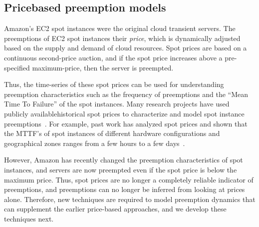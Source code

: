 \subsection{Price\vj{-}based preemption models}

Amazon's EC2 spot instances were the original cloud transient servers.
The preemptions of EC2 spot instances   their \emph{price}, which is dynamically adjusted based on the supply and demand of cloud resources.
Spot prices are  based on a continuous second-price auction, and if the spot price increases above a pre-specified maximum-price, then the server is preempted.

Thus, the time-series of these spot prices can be used for understanding preemption characteristics such as the frequency of preemptions and the ``Mean Time To Failure'' of the spot instances.
Many research projects have used publicly available\footnotemark historical spot prices to characterize and model spot instance preemptions~\cite{spotcheck,how-to-bid}. %
For example, past work has analyzed spot prices and shown that the MTTF's of spot instances of different hardware configurations and geographical zones ranges from a few hours to a few days~\cite{prateek-thesis, shastri-thesis}. 



However, Amazon has recently changed the preemption characteristics of spot instances, and servers are now preempted even if the spot price is below the maximum price.
Thus, spot prices are no longer a completely reliable indicator of preemptions, and preemptions can no longer be inferred from looking at prices alone.
Therefore, new techniques are required to model preemption dynamics that can supplement the earlier price-based approaches, and we develop these techniques next.



